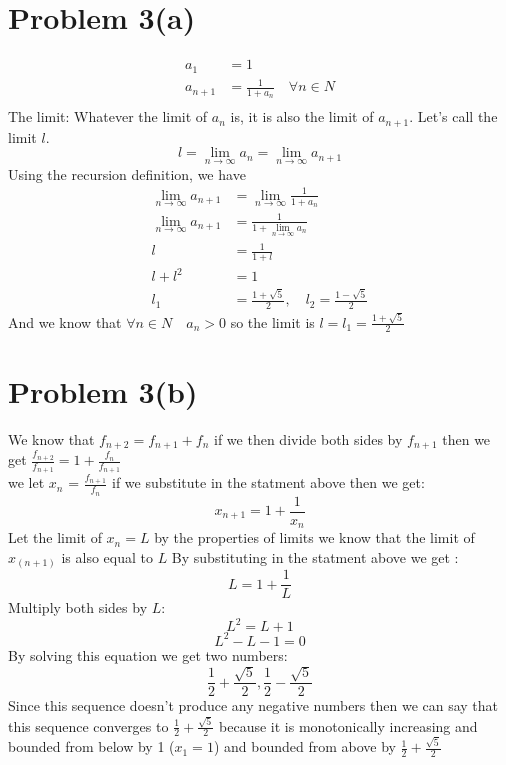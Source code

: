\documentclass{article}
\begin{document}
\section*{Problem 3(a)}
\begin{align*}
   a_1 &= 1 \\
   a_{n+1} &= \frac{1}{1 + a_n} \quad \forall n \in N \\
\end{align*}
The limit:
Whatever the limit of \(a_n\) is, it is also the limit of \(a_{n+1}\). Let's call the limit \(l\).
\[
   l = \lim_{n \rightarrow \infty} a_n = \lim_{n \rightarrow \infty} a_{n+1}
\]
Using the recursion definition, we have
\begin{align*}
   \lim_{n \rightarrow \infty} a_{n+1} &= \lim_{n \rightarrow \infty} \frac{1}{1 + a_n} \\
   \lim_{n \rightarrow \infty} a_{n+1} &= \frac{1}{1 + \lim_{n \rightarrow \infty} a_n} \\
   l &= \frac{1}{1 + l} \\
   l + l^2 &= 1 \\
   l_1 &= \frac{1+\sqrt{5}}{2}, \quad l_2 = \frac{1-\sqrt{5}}{2}
\end{align*}
And we know that \(\forall n \in N \quad a_n > 0\) so the limit is \(l = l_1 = \frac{1+\sqrt{5}}{2}\)
\section*{Problem 3(b)}
We know that \(f_{n+2} = f_{n+1} + f_{n} \) if we then divide both sides by \(f_{n+1}\) then we get
\( \frac{f_{n+2}}{f_{n+1}}  = 1 + \frac{f_{n}}{f_{n+1}} \)\\
 we let \(x_{n}\) = \(\frac{f_{n+1}}{f_{n}}\) if we substitute in the statment above then we get:
 \[
   x_{n+1} = 1 + \frac{1}{x_{n}}
 \]
 Let the limit of \(x_{n} = L\) by the properties of limits we know that the limit of \(x_(n+1)\) is also equal to \(L\)
 By substituting in the statment above we get :
 \[
   L = 1 + \frac{1}{L}
 \]
 Multiply both sides by \( L \):
\[
L^2 = L + 1
\]
\[L^2 - L - 1 = 0\]
By solving this equation we get two numbers:
\[
   \frac{1}{2} + \frac{\sqrt{5}}{2}, \frac{1}{2} - \frac{\sqrt{5}}{2}
\]
Since this sequence doesn't produce any negative numbers then we can say that 
this sequence converges to \(\frac{1}{2} + \frac{\sqrt{5}}{2}\) because it is monotonically increasing and bounded from below by 1 (\(x_{1} = 1\)) and bounded from above by
\(\frac{1}{2} + \frac{\sqrt{5}}{2}\)
\end{document}
